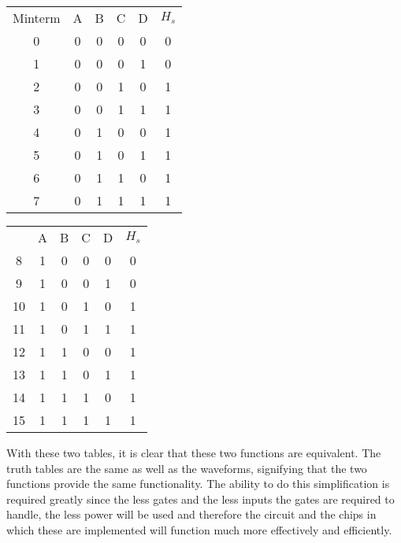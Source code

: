 \documentclass[12pt]{article}
\begin{document}
    \begin{center}
        \begin{tabular}{ccccc|c}
            Minterm & A & B & C & D & $H_s$ \\
            \cmidrule{2-6}
            0 & 0 & 0 & 0 & 0 & 0 \\
            1 & 0 & 0 & 0 & 1 & 0 \\
            2 & 0 & 0 & 1 & 0 & 1 \\
            3 & 0 & 0 & 1 & 1 & 1 \\
            4 & 0 & 1 & 0 & 0 & 1 \\
            5 & 0 & 1 & 0 & 1 & 1 \\
            6 & 0 & 1 & 1 & 0 & 1 \\
            7 & 0 & 1 & 1 & 1 & 1 \\
        \end{tabular}
        \quad
        \begin{tabular}{ccccc|c}
            & A & B & C & D & $H_s$ \\
            \cmidrule{2-6}
            8 & 1 & 0 & 0 & 0 & 0 \\
            9 & 1 & 0 & 0 & 1 & 0 \\
            10 & 1 & 0 & 1 & 0 & 1 \\
            11 & 1 & 0 & 1 & 1 & 1 \\
            12 & 1 & 1 & 0 & 0 & 1 \\
            13 & 1 & 1 & 0 & 1 & 1 \\
            14 & 1 & 1 & 1 & 0 & 1 \\
            15 & 1 & 1 & 1 & 1 & 1 \\
        \end{tabular}
    \end{center}
    \par With these two tables, it is clear that these two functions are
    equivalent. The truth tables are the same as well as the waveforms,
    signifying that the two functions provide the same functionality. The
    ability to do this simplification is required greatly since the less gates
    and the less inputs the gates are required to handle, the less power will be
    used and therefore the circuit and the chips in which these are implemented
    will function much more effectively and efficiently.
\end{document}
